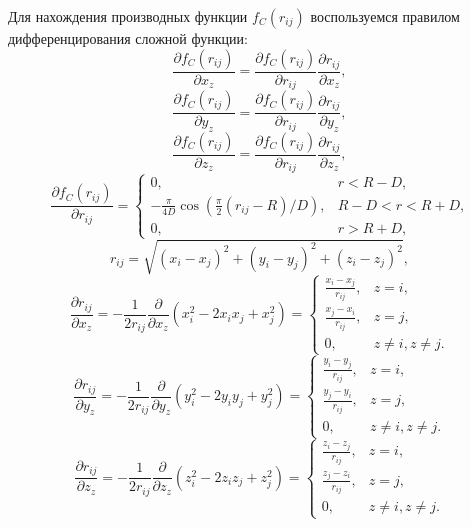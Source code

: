 Для нахождения производных функции $f_C(r_{ij})$ воспользуемся правилом дифференцирования сложной функции:
\begin{equation}
\frac{\partial f_C(r_{ij})}{\partial x_z} =  \frac{\partial f_C(r_{ij})}{\partial r_{ij}}\frac{\partial r_{ij}}{\partial x_z},
\end{equation}
\begin{equation}
\frac{\partial f_C(r_{ij})}{\partial y_z} =  \frac{\partial f_C(r_{ij})}{\partial r_{ij}}\frac{\partial r_{ij}}{\partial y_z},
\end{equation}
\begin{equation}
\frac{\partial f_C(r_{ij})}{\partial z_z} =  \frac{\partial f_C(r_{ij})}{\partial r_{ij}}\frac{\partial r_{ij}}{\partial z_z},
\end{equation}
\[
\frac{\partial f_C(r_{ij})}{\partial r_{ij}} =
\begin{cases}
0, &\text{$r < R - D$,}\\
- \frac{\pi}{4D}\cos \left(\frac{\pi}{2} (r_{ij} -R) / D\right), &\text{$R - D < r < R + D$,}\\
0, &\text{$r > R + D$,}
\end{cases}
\]
\begin{equation}
r_{ij} = \sqrt{(x_i - x_j)^2 + (y_i - y_j)^2 + (z_i - z_j)^2},
\end{equation}
\[
\frac{\partial r_{ij}}{\partial x_z} =-\frac{1}{2 r_{ij}}\frac{\partial}{\partial x_z}\left(x^2_i - 2 x_i x_j + x^2_j\right) = 
\begin{cases}
\frac{x_i - x_j}{r_{ij}}, &\text{$z = i$,}\\
\frac{x_j - x_i}{r_{ij}}, &\text{$z = j$,}\\
0, &\text{$z \neq i, z \neq j$.}
\end{cases}
\]
\[
\frac{\partial r_{ij}}{\partial y_z} =-\frac{1}{2 r_{ij}}\frac{\partial}{\partial y_z}\left(y^2_i - 2 y_i y_j + y^2_j\right) = 
\begin{cases}
\frac{y_i - y_j}{r_{ij}}, &\text{$z = i$,}\\
\frac{y_j - y_i}{r_{ij}}, &\text{$z = j$,}\\
0, &\text{$z \neq i, z \neq j$.}
\end{cases}
\]
\[
\frac{\partial r_{ij}}{\partial z_z} =-\frac{1}{2 r_{ij}}\frac{\partial}{\partial z_z}\left(z^2_i - 2 z_i z_j + z^2_j\right) = 
\begin{cases}
\frac{z_i - z_j}{r_{ij}}, &\text{$z = i$,}\\
\frac{z_j - z_i}{r_{ij}}, &\text{$z = j$,}\\
0, &\text{$z \neq i, z \neq j$.}
\end{cases}
\]

